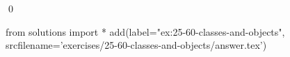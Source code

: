 
\begin{ex}
  \label{ex:25-60-classes-and-objects}
  
  \qed
\end{ex}
\begin{python0}
from solutions import *
add(label="ex:25-60-classes-and-objects",
    srcfilename='exercises/25-60-classes-and-objects/answer.tex')
\end{python0}
